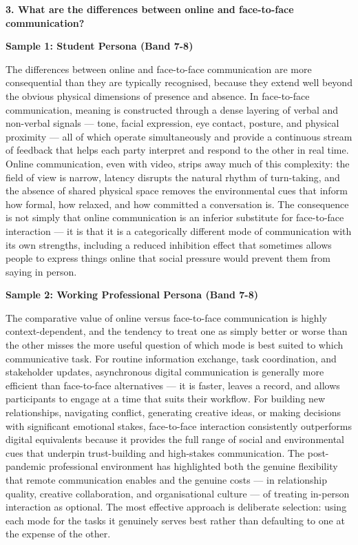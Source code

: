 \separator

\begin{ieltsquestion}
\textbf{3. What are the differences between online and face-to-face communication?}
\end{ieltsquestion}
\textbf{Sample 1: Student Persona (Band 7-8)}

The differences between online and face-to-face communication are more consequential than they are typically recognised, because they extend well beyond the obvious physical dimensions of presence and absence. In face-to-face communication, meaning is constructed through a dense layering of verbal and non-verbal signals — tone, facial expression, eye contact, posture, and physical proximity — all of which operate simultaneously and provide a continuous stream of feedback that helps each party interpret and respond to the other in real time. Online communication, even with video, strips away much of this complexity: the field of view is narrow, latency disrupts the natural rhythm of turn-taking, and the absence of shared physical space removes the environmental cues that inform how formal, how relaxed, and how committed a conversation is. The consequence is not simply that online communication is an inferior substitute for face-to-face interaction — it is that it is a categorically different mode of communication with its own strengths, including a reduced inhibition effect that sometimes allows people to express things online that social pressure would prevent them from saying in person.

\textbf{Sample 2: Working Professional Persona (Band 7-8)}

The comparative value of online versus face-to-face communication is highly context-dependent, and the tendency to treat one as simply better or worse than the other misses the more useful question of which mode is best suited to which communicative task. For routine information exchange, task coordination, and stakeholder updates, asynchronous digital communication is generally more efficient than face-to-face alternatives — it is faster, leaves a record, and allows participants to engage at a time that suits their workflow. For building new relationships, navigating conflict, generating creative ideas, or making decisions with significant emotional stakes, face-to-face interaction consistently outperforms digital equivalents because it provides the full range of social and environmental cues that underpin trust-building and high-stakes communication. The post-pandemic professional environment has highlighted both the genuine flexibility that remote communication enables and the genuine costs — in relationship quality, creative collaboration, and organisational culture — of treating in-person interaction as optional. The most effective approach is deliberate selection: using each mode for the tasks it genuinely serves best rather than defaulting to one at the expense of the other.

